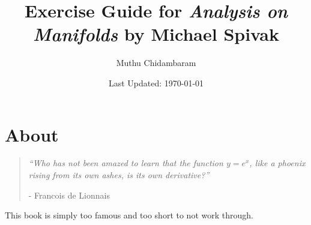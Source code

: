 \documentclass{article}
\begin{document}
\title{Exercise Guide for \textit{Analysis on Manifolds} by Michael Spivak}
\author{Muthu Chidambaram}
\date{Last Updated: \today} 

\maketitle

\tableofcontents
\newpage 

\section*{About}

\begin{quote}
        \textit{``Who has not been amazed to learn that the function $y = e^x$, like a phoenix rising from its own ashes, is its own derivative?''} 
        
        - Francois de Lionnais
\end{quote}

This book is simply too famous and too short to not work through.


\end{document}
